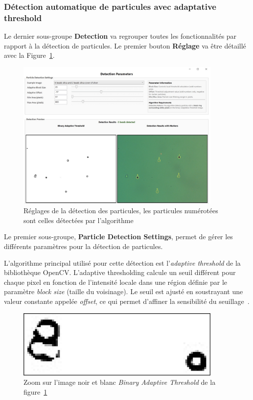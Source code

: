 \newpage
\subsubsection{Détection automatique de particules avec adaptative threshold}
Le dernier sous-groupe \textbf{Detection} va regrouper toutes les fonctionnalités par rapport à la détection de particules. Le premier bouton \textbf{Réglage} va être détaillé avec la Figure~\ref{Settings_Detection}.
\begin{figure}[H]
    \centering
    \includegraphics[width=0.9\textwidth]{assets/figures/Application_ServoVision/Settings_Detection.jpeg}
    \caption{Réglages de la détection des particules, les particules numérotées sont celles détectées par l'algorithme}
    \label{Settings_Detection}
\end{figure}
Le premier sous-groupe, \textbf{Particle Detection Settings}, permet de gérer les différents paramètres pour la détection de particules.

L'algorithme principal utilisé pour cette détection est l'\textit{adaptive threshold} de la bibliothèque OpenCV. L'adaptive thresholding calcule un seuil différent pour chaque pixel en fonction de l'intensité locale dans une région définie par le paramètre  \textit{block size} (taille du voisinage). Le seuil est ajusté en soustrayant une valeur constante appelée \textit{offset}, ce qui permet d'affiner la sensibilité du seuillage~\cite{OpenCVadaptativeThreshold}.
\newpage
\begin{figure}[H]
    \centering
    \includegraphics[width=0.9\textwidth]{assets/figures/Application_ServoVision/Settings_Detection_zoom.png}
    \caption{Zoom sur l'image noir et blanc \textit{Binary Adaptive Threshold} de la figure~\ref{Settings_Detection}}
    \label{Settings_Camera_zoom}
\end{figure}


